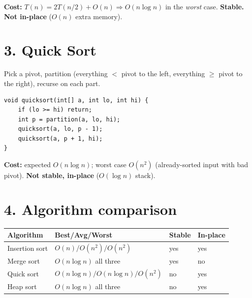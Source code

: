 \documentclass[11pt]{article}
\begin{document}
\textbf{Cost:} $T(n) = 2T(n/2) + O(n) \Rightarrow O(n\log n)$ in the \emph{worst} case. \textbf{Stable. Not in-place} ($O(n)$ extra memory).

\section*{3. Quick Sort}

Pick a pivot, partition (everything $<$ pivot to the left, everything $\geq$ pivot to the right), recurse on each part.

\begin{lstlisting}
void quicksort(int[] a, int lo, int hi) {
    if (lo >= hi) return;
    int p = partition(a, lo, hi);
    quicksort(a, lo, p - 1);
    quicksort(a, p + 1, hi);
}
\end{lstlisting}

\textbf{Cost:} expected $O(n\log n)$; worst case $O(n^2)$ (already-sorted input with bad pivot). \textbf{Not stable, in-place} ($O(\log n)$ stack).

\section*{4. Algorithm comparison}

\begin{center}
\begin{tabular}{llll}
\textbf{Algorithm} & \textbf{Best/Avg/Worst} & \textbf{Stable} & \textbf{In-place} \\
\hline
Insertion sort & $O(n)/O(n^2)/O(n^2)$       & yes & yes \\
Merge sort     & $O(n\log n)$ all three     & yes & no \\
Quick sort     & $O(n\log n)/O(n\log n)/O(n^2)$ & no  & yes \\
Heap sort      & $O(n\log n)$ all three     & no  & yes \\
\end{tabular}
\end{center}
\end{document}

